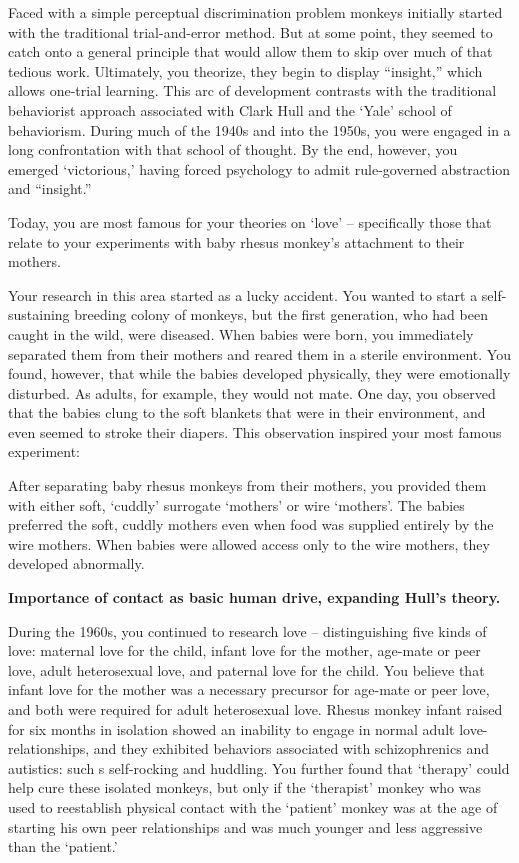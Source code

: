 \begin{refsection}
Faced with a simple perceptual discrimination problem monkeys initially started with the traditional trial-and-error method. But at some point, they seemed to catch onto a general principle that would allow them to skip over much of that tedious work. Ultimately, you theorize, they begin to display “insight,” which allows one-trial learning. This arc of development contrasts with the traditional behaviorist approach associated with Clark Hull and the `Yale' school of behaviorism. During much of the 1940s and into the 1950s, you were engaged in a long confrontation with that school of thought. By the end, however, you emerged `victorious,' having forced psychology to admit rule-governed abstraction and “insight.”

Today, you are most famous for your theories on `love' – specifically those that relate to your experiments with baby rhesus monkey's attachment to their mothers.

Your research in this area started as a lucky accident. You wanted to start a self-sustaining breeding colony of monkeys, but the first generation, who had been caught in the wild, were diseased. When babies were born, you immediately separated them from their mothers and reared them in a sterile environment. You found, however, that while the babies developed physically, they were emotionally disturbed. As adults, for example, they would not mate. One day, you observed that the babies clung to the soft blankets that were in their environment, and even seemed to stroke their diapers. This observation inspired your most famous experiment:

After separating baby rhesus monkeys from their mothers, you provided them with either soft, `cuddly' surrogate `mothers' or wire `mothers'. The babies preferred the soft, cuddly mothers even when food was supplied entirely by the wire mothers. When babies were allowed access only to the wire mothers, they developed abnormally.

\textbf{Importance of contact as basic human drive, expanding Hull's theory.}

During the 1960s, you continued to research love – distinguishing five kinds of love: maternal love for the child, infant love for the mother, age-mate or peer love, adult heterosexual love, and paternal love for the child. You believe that infant love for the mother was a necessary precursor for age-mate or peer love, and both were required for adult heterosexual love. Rhesus monkey infant raised for six months in isolation showed an inability to engage in normal adult love-relationships, and they exhibited behaviors associated with schizophrenics and autistics: such s self-rocking and huddling. You further found that `therapy' could help cure these isolated monkeys, but only if the `therapist' monkey who was used to reestablish physical contact with the `patient' monkey was at the age of starting his own peer relationships and was much younger and less aggressive than the `patient.'


\end{refsection}
